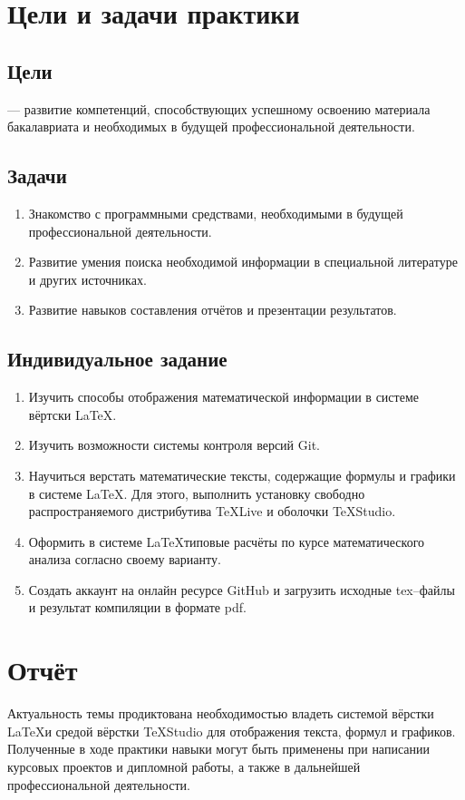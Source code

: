 \documentclass[12pt]{article}
\begin{document}


\newpage	
\tableofcontents

\newpage
\section{Цели и задачи практики}	
\subsection{Цели}
--- развитие компетенций, способствующих успешному освоению материала бакалавриата и необходимых в будущей профессиональной деятельности.

\subsection{Задачи}
\begin{enumerate}
\item Знакомство с программными средствами, необходимыми в будущей профессиональной деятельности.
\item Развитие умения поиска необходимой информации в специальной литературе и других источниках.
\item Развитие навыков составления отчётов и презентации результатов.
\end{enumerate}

\subsection{Индивидуальное задание}	
\begin{enumerate}
\item Изучить способы отображения математической информации в системе вёртски \LaTeX.
\item Изучить возможности  системы контроля версий \textsf{Git}.
\item Научиться верстать математические тексты, содержащие формулы и графики в системе \LaTeX.
Для этого, выполнить установку свободно распространяемого дистрибутива \textsf{TeXLive} и оболочки \textsf{TeXStudio}.
\item Оформить в системе \LaTeX типовые расчёты по курсе математического анализа согласно своему варианту.
\item Создать аккаунт на онлайн ресурсе \textsf{GitHub} и загрузить исходные \textsf{tex}--файлы 
и результат компиляции в формате \textsf{pdf}.
\end{enumerate} 

\newpage
\section{Отчёт}
Актуальность темы продиктована необходимостью владеть системой вёрстки \LaTeX и средой вёрстки \textsf{TeXStudio} для
отображения текста, формул и графиков. Полученные в ходе практики навыки могут быть применены при написании
курсовых проектов и дипломной работы, а также в дальнейшей профессиональной деятельности.
\end{document}

